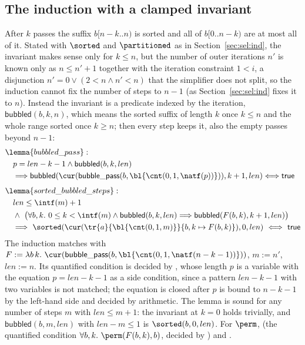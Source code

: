 \subsection{The induction with a clamped invariant}
After $k$ passes the suffix $b[n - k..n)$ is sorted and all of $b[0..n - k)$ are at most all of it. Stated
with $\sorted$ and $\partitioned$ as in Section~\ref{sec:sel:ind}, the invariant makes sense only for $k \le n$, but
the number of outer iterations $n'$ is known only as $n \le n' + 1$ together with the iteration
constraint $1 < i$, a disjunction $n' = 0 \vee (2 < n \wedge n' < n)$ that the simplifier does not split,
so the induction cannot fix the number of steps to $n - 1$ (as Section~\ref{sec:sel:ind} fixes it to $n$). Instead the
invariant is a predicate indexed by the iteration, $\mathsf{bubbled}(b, k, n)$, which means the sorted
suffix of length $k$ once $k \le n$ and the whole range sorted once $k \ge n$; then every step keeps it,
also the empty passes beyond $n - 1$:
\begin{align*}
  &\lemma{bubbled\_pass}:\\
  &\quad p = len - k - 1 \wedge \mathsf{bubbled}(b, k, len)\\
  &\quad\Longrightarrow \mathsf{bubbled}(\cur(\mathsf{bubble\_pass}(b, \bl{\cnt(0, 1, \natf(p))})), k + 1, len)
    \Longleftrightarrow \mathsf{true}\\[4pt]
  &\lemma{sorted\_bubbled\_steps}:\\
  &\quad len \le \intf(m) + 1\\
  &\quad\wedge\ \big(\forall b, k.\ 0 \le k < \intf(m) \wedge \mathsf{bubbled}(b, k, len) \Longrightarrow \mathsf{bubbled}(F(b, k), k + 1, len)\big)\\
  &\quad\Longrightarrow\ \sorted(\cur(\tr{a}{\bl{\cnt(0, 1, m)}}{b, k \mapsto F(b, k)}), 0, len)\ \Longleftrightarrow\ \mathsf{true}
\end{align*}
The induction matches with $F := \lambda b\, k.\ \cur(\mathsf{bubble\_pass}(b, \bl{\cnt(0, 1, \natf(n - k - 1))}))$,
$m := n'$, $len := n$. Its quantified condition is decided by , whose length $p$ is a
variable with the equation $p = len - k - 1$ as a side condition, since a pattern $len - k - 1$ with two
variables is not matched; the equation is closed after $p$ is bound to $n - k - 1$ by the left-hand side
and decided by arithmetic. The lemma is sound for any number of steps $m$ with $len \le m + 1$: the
invariant at $k = 0$ holds trivially, and $\mathsf{bubbled}(b, m, len)$ with $len - m \le 1$ is
$\sorted(b, 0, len)$. For $\perm$,  (the quantified condition $\forall b, k.\ \perm(F(b, k), b)$,
decided by ) and .

